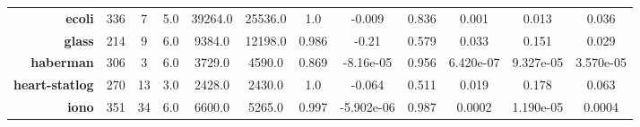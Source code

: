 \begin{table}[ht!]
{\begin{tabular}{|r|ccccccccccc|}
    \textbf{ecoli}         & 336                                    & 7                                       & 5.0                                     & 39264.0                                      & 25536.0                                           & 1.0                                          & -0.009                                & 0.836                            & 0.001                                   & 0.013                                   & 0.036                                    \\
    \textbf{glass}         & 214                                    & 9                                       & 6.0                                     & 9384.0                                       & 12198.0                                           & 0.986                                        & -0.21                                 & 0.579                            & 0.033                                   & 0.151                                   & 0.029                                    \\
    \textbf{haberman}      & 306                                    & 3                                       & 6.0                                     & 3729.0                                       & 4590.0                                            & 0.869                                        & -8.16e-05                             & 0.956                            & 6.420e-07                               & 9.327e-05                               & 3.570e-05                                \\
    \textbf{heart-statlog} & 270                                    & 13                                      & 3.0                                     & 2428.0                                       & 2430.0                                            & 1.0                                          & -0.064                                & 0.511                            & 0.019                                   & 0.178                                   & 0.063                                    \\
    \textbf{iono}          & 351                                    & 34                                      & 6.0                                     & 6600.0                                       & 5265.0                                            & 0.997                                        & -5.902e-06                            & 0.987                            & 0.0002                                  & 1.190e-05                               & 0.0004                                   \\

\end{tabular}}
\end{table}
